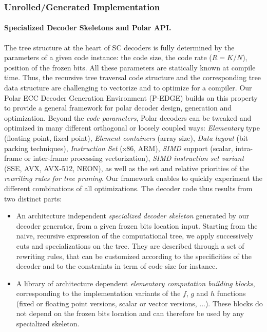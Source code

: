\subsubsection{Unrolled/Generated Implementation}

\paragraph{Specialized Decoder Skeletons and Polar API.}

The tree structure at the heart of SC decoders is fully determined by the
parameters of a given code instance: the code size, the code rate ($R = K / N$),
position of the frozen bits. All these parameters are  statically known at
compile time. Thus, the recursive tree traversal code structure and the
corresponding tree data structure are challenging to vectorize and to optimize
for a compiler. Our Polar ECC Decoder Generation Environment (P-EDGE) builds on
this property to provide a general framework for polar decoder design,
generation and optimization. Beyond the \emph{code parameters}, Polar decoders
can be tweaked and optimized in many different orthogonal or loosely coupled
ways: \emph{Elementary} type (floating point, fixed point),
\emph{Element containers} (array size), \emph{Data layout} (bit packing
techniques), \emph{Instruction Set} (x86, ARM\R), \emph{SIMD} support (scalar,
intra-frame or inter-frame processing vectorization), \emph{SIMD instruction set
variant} (SSE, AVX, AVX-512, NEON), as well as the set and relative priorities
of the \emph{rewriting rules for tree pruning}. Our framework enables to quickly
experiment the different combinations of all optimizations. The decoder code
thus results from two distinct parts:
\begin{itemize}
  \item An architecture independent \emph{specialized decoder skeleton}
    generated by our decoder generator, from a given frozen bits location input.
    Starting from the naive, recursive expression of the computational tree, we
    apply successively cuts and specializations on the tree. They are described
    through a set of rewriting rules, that can be customized according to the
    specificities of the decoder and to the constraints in term of code size for
    instance.
  \item A library of architecture dependent \emph{elementary computation
    building blocks}, corresponding to the implementation variants of the $f$,
    $g$ and $h$ functions (fixed or floating point versions, scalar or vector
    versions, ...). These blocks do not depend on the frozen bits location and
    can therefore be used by any specialized skeleton.
\end{itemize}


